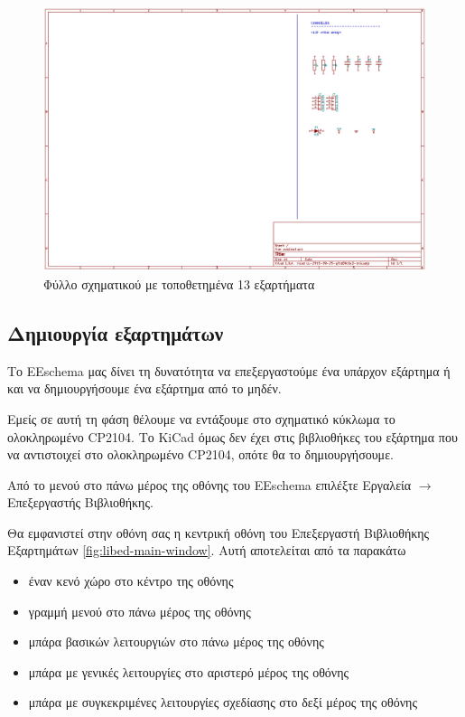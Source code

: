 \documentclass[a4paper]{article}
\begin{document}
\begin{figure}
  \begin{center}
    \includegraphics[width=.9\textwidth]{img/eesch-circ-placedccompcop.png}
    \caption{Φύλλο σχηματικού με τοποθετημένα 13 εξαρτήματα}
    \label{fig:eesch-circ-placedccompcop}
  \end{center}
\end{figure}


\subsection{Δημιουργία εξαρτημάτων}
Το \textenglish{EEschema} μας δίνει τη δυνατότητα να επεξεργαστούμε ένα υπάρχον εξάρτημα ή και να δημιουργήσουμε ένα εξάρτημα από το μηδέν.

Εμείς σε αυτή τη φάση θέλουμε να εντάξουμε στο σχηματικό κύκλωμα το ολοκληρωμένο \textenglish{CP2104}. Το \textenglish{KiCad} όμως δεν έχει στις βιβλιοθήκες του εξάρτημα που να αντιστοιχεί στο ολοκληρωμένο \textenglish{CP2104}, οπότε θα το δημιουργήσουμε.

Από το μενού στο πάνω μέρος της οθόνης του \textenglish{EEschema} επιλέξτε Εργαλεία $\rightarrow$ Επεξεργαστής Βιβλιοθήκης.

Θα εμφανιστεί στην οθόνη σας η κεντρική οθόνη του Επεξεργαστή Βιβλιοθήκης Εξαρτημάτων \ref{fig:libed-main-window}. Αυτή αποτελείται από τα παρακάτω
\begin{itemize}
    \item έναν κενό χώρο στο κέντρο της οθόνης
    \item γραμμή μενού στο πάνω μέρος της οθόνης
    \item μπάρα βασικών λειτουργιών στο πάνω μέρος της οθόνης
    \item μπάρα με γενικές λειτουργίες στο αριστερό μέρος της οθόνης
    \item μπάρα με συγκεκριμένες λειτουργίες σχεδίασης στο δεξί μέρος της οθόνης
\end{itemize}
\end{document}

